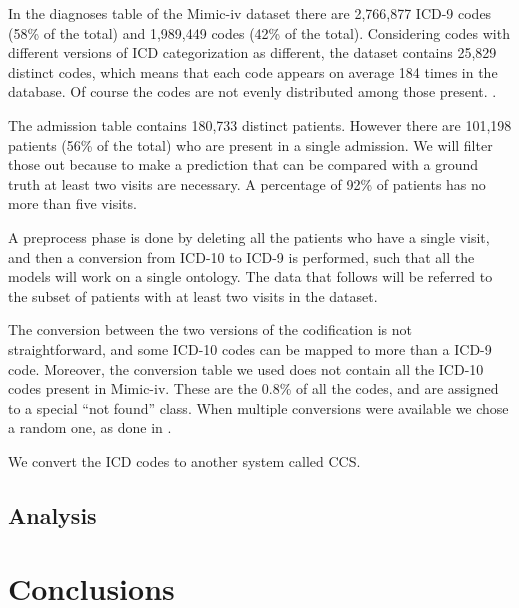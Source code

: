 \documentclass[]{marticle}
\begin{document}
In the diagnoses table of the Mimic-iv dataset there are 2,766,877 ICD-9 codes (58\% of the total)
and 1,989,449 codes (42\% of the total). Considering codes with different versions of ICD
categorization as different, the dataset contains 25,829 distinct codes, which means that each code
appears on average 184 times in the database. Of course the codes are not evenly distributed among
those present. .


The admission table contains 180,733 distinct patients. However there are 101,198 patients (56\% of
the total) who are present in a single admission. We will filter those out because to make a
prediction that can be compared with a ground truth at least two visits are necessary. A percentage
of 92\% of patients has no more than five visits.

A preprocess phase is done by deleting all the patients who have a single visit, and then a
conversion from ICD-10 to ICD-9 is performed, such that all the models will work on a single
ontology. The data that follows will be referred to the subset of patients with at least two visits
in the dataset.

The conversion between the two versions of the codification is not straightforward, and some ICD-10
codes can be mapped to more than a ICD-9 code. Moreover, the conversion table we used 
does not contain all the ICD-10 codes present in Mimic-iv. These are the 0.8\% of all the codes, and
are assigned to a special ``not found'' class. When multiple conversions were available we chose a
random one, as done in \cite{setor-paper}.

We convert the ICD codes to another system called CCS. 

\subsection{Analysis}

\section{Conclusions}



\end{document}
